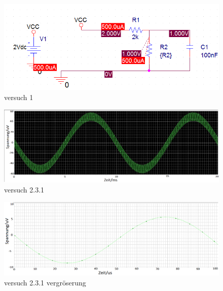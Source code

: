 \documentclass[a4paper]{article}
\begin{document}
\begin{figure}[ht]
\hspace{-4.5cm}
\includegraphics[scale=1.2]{SchaltungVersuch1}
\caption{versuch 1}
\end{figure}

\vspace{4cm}
\begin{figure}[ht]

\vspace{-4.5cm}
\hspace{-4cm}
\includegraphics[scale=0.5]{Versuch231}
\caption{versuch 2.3.1}
\end{figure}
\hspace{1cm}

\begin{figure}
\vspace{3.5cm}
\hspace{-4.5cm}
\includegraphics[scale=0.5]{Versuch231Vergrerteauschnit}
\caption{versuch 2.3.1 vergr\"oserung}
\end{figure}
\end{document}
